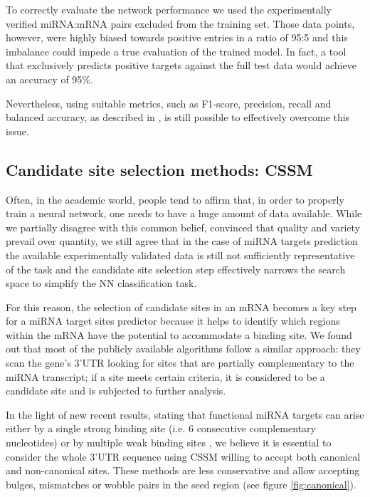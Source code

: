 To correctly evaluate the network performance we used the experimentally verified miRNA:mRNA pairs excluded from the training set. Those data points, however, were highly biased towards positive entries in a ratio of 95:5 and this imbalance could impede a true evaluation of the trained model. In fact, a tool that exclusively predicts positive targets against the full test data would achieve an accuracy of 95\%. 

Nevertheless, using suitable metrics, such as F1-score, precision, recall and balanced accuracy, as described in \cite{imbalanced}, is still possible to effectively overcome this issue.

\subsection{Candidate site selection methods: CSSM}
Often, in the academic world, people tend to affirm that, in order to properly train a neural network, one needs to have a huge amount of data available. While we partially disagree with this common belief, convinced that quality and variety prevail over quantity, we still agree that in the case of miRNA targets prediction the available experimentally validated data is still not sufficiently representative of the task and the candidate site selection step effectively narrows the search space to simplify the NN classification task.

For this reason, the selection of candidate sites in an mRNA becomes a key step for a miRNA target sites predictor because it helps to identify which regions within the mRNA have the potential to accommodate a binding site. We found out that most of the publicly available algorithms follow a similar approach: they scan the gene's 3'UTR  looking for sites that are partially complementary to the miRNA transcript; if a site meets certain criteria, it is considered to be a candidate site and is subjected to further analysis.

In the light of new recent results, stating that functional miRNA targets can arise either by a single strong binding site (i.e. 6 consecutive complementary nucleotides) or by multiple weak binding sites \cite{helwak}, we believe it is essential to consider the whole 3'UTR sequence using CSSM willing to accept both canonical and non-canonical sites. These methods are less conservative and allow accepting bulges, mismatches or wobble pairs in the seed region (see figure \ref{fig:canonical}).


